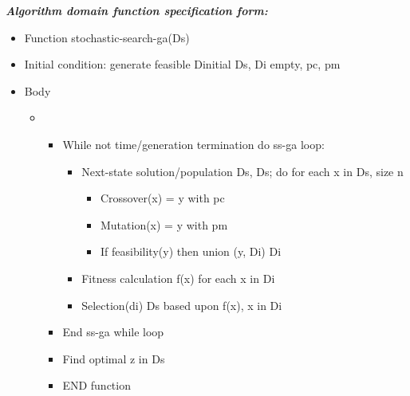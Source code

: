 \documentclass[journal]{IEEEtran}
\begin{document}
\textbf{\textit{Algorithm domain function specification form:}}\par

\begin{itemize}
	\item Function stochastic-search-ga(Ds)\par

	\item Initial condition: generate feasible Dinitial \textrightarrow Ds, Di empty, pc, pm\par

	\item Body\par

\begin{itemize}
	\item \begin{itemize}
	\item While not time/generation termination do ss-ga loop:\par

\begin{itemize}
	\item Next-state solution/population Ds, Ds\textrightarrowDi; do for each x in Ds, size n\par

\begin{itemize}
	\item Crossover(x) = y with pc\par

	\item Mutation(x) = y with pm\par

	\item If feasibility(y) then union (y, Di) \textrightarrow Di\par

\end{itemize}
	\item Fitness calculation f(x) for each x in Di\par

	\item Selection(di) \textrightarrow Ds based upon f(x), x in Di\par

\end{itemize}
	\item End ss-ga while loop\par

	\item Find optimal z in Ds\par

	\item END function
\end{itemize}
\end{itemize}
\end{itemize}\par
\end{document}

